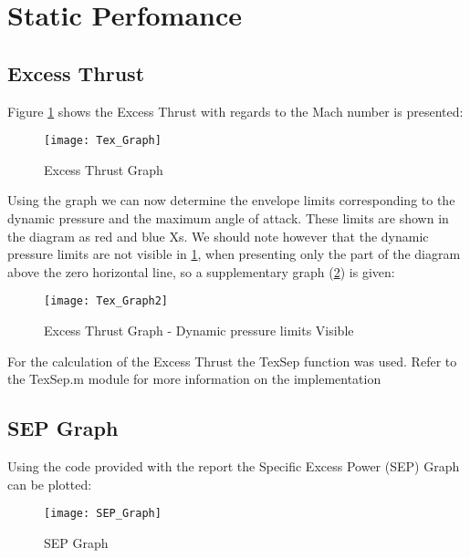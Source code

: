\section{Static Perfomance}

\subsection{Excess Thrust}

Figure \ref{fig:Tex_Graph} shows the Excess Thrust with regards to the Mach number is presented:

\begin{figure}[H]
    \centering
    \hspace*{-2cm}
    \texttt{[image: Tex\_Graph]}
    \caption{Excess Thrust Graph}
    \label{fig:Tex_Graph}
\end{figure}

Using the graph we can now determine the envelope limits corresponding to the dynamic pressure and the 
maximum angle of attack. These limits are shown in the diagram as red and blue Xs.
We should note however that the dynamic pressure limits are not visible in  \ref{fig:Tex_Graph}, when presenting 
only the part of the diagram above the zero horizontal line, so a supplementary graph (\ref{fig:Tex_Graph2}) is given:

\begin{figure}[H]
    \centering
    \hspace*{-2cm}
    \texttt{[image: Tex\_Graph2]}
    \caption{Excess Thrust Graph - Dynamic pressure limits Visible}
    \label{fig:Tex_Graph2}
\end{figure}

\noindent For the calculation of the Excess Thrust the TexSep function was used. Refer to the TexSep.m module 
for more information on the implementation

\subsection{SEP Graph}

Using the code provided with the report the Specific Excess Power (SEP) Graph
can be plotted:

\begin{figure}[H]
    \centering
    \hspace*{-2cm}
    \texttt{[image: SEP\_Graph]}
    \caption{SEP Graph}
    \label{fig:SEP_Graph}
\end{figure}

